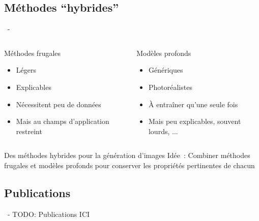\documentclass[aspectratio=169, 22pt]{beamer}
\begin{document}
\subsection{Méthodes ``hybrides''}
\begin{frame}{\secname~- \subsecname}
  \begin{columns}
    \begin{column}{0.5\linewidth}
      \begin{block}{Méthodes frugales}
        \begin{itemize}
        \item \small Légers
        \item \small Explicables
        \item \small Nécessitent peu de données
        \item \small Mais au champs d'application restreint
        \end{itemize}
      \end{block}      
    \end{column}
    
    \begin{column}{0.5\linewidth}
      \begin{block}{Modèles profonds}
        \begin{itemize}
        \item \small Génériques
        \item \small Photoréalistes
        \item \small À entraîner qu'une seule fois
        \item \small Mais peu explicables, souvent lourds, ...
        \end{itemize}
      \end{block}      
    \end{column}
  \end{columns}

  \vfill
  \begin{exampleblock}{\centering Des méthodes hybrides pour la génération d'images}
    \centering
    \alert{Idée}~: Combiner méthodes frugales et modèles profonds pour
    conserver les propriétés pertinentes de chacun
  \end{exampleblock}
\end{frame}

\subsection{Publications}
\begin{frame}{\secname~- \subsecname}
  \alert{TODO: Publications ICI}
\end{frame}
\end{document}
